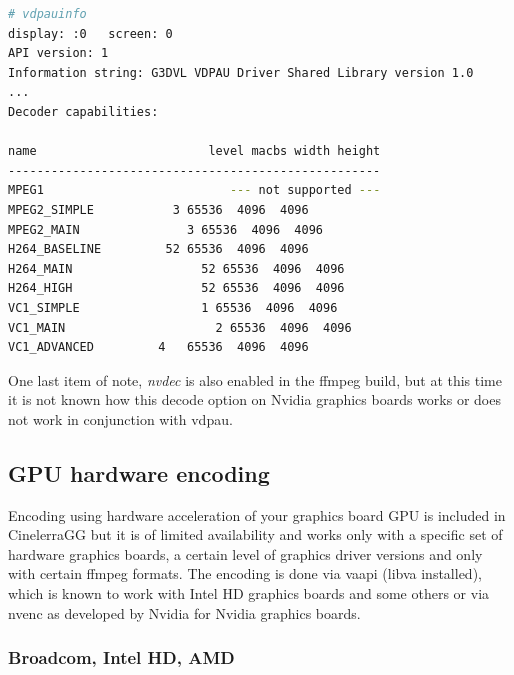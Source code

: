 \begin{lstlisting}[language=bash,numbers=none]
# vdpauinfo
display: :0   screen: 0
API version: 1
Information string: G3DVL VDPAU Driver Shared Library version 1.0
...
Decoder capabilities:

name                        level macbs width height
----------------------------------------------------
MPEG1                          --- not supported ---                                                                      
MPEG2_SIMPLE           3 65536  4096  4096                                                                       
MPEG2_MAIN               3 65536  4096  4096                                                                       
H264_BASELINE         52 65536  4096  4096                                                                       
H264_MAIN                  52 65536  4096  4096                                                                       
H264_HIGH                  52 65536  4096  4096                                                                       
VC1_SIMPLE                 1 65536  4096  4096                                                                       
VC1_MAIN                     2 65536  4096  4096                                                                       
VC1_ADVANCED         4   65536  4096  4096 
\end{lstlisting}

One last item of note, \textit{nvdec} is also enabled in the ffmpeg build, but at this time it is not known how this decode option on Nvidia graphics boards works or does not work in conjunction with vdpau.

\subsection{GPU hardware encoding}%
\label{sub:gpu_hardware_encoding}

Encoding using hardware acceleration of your graphics board GPU is included in CinelerraGG but it is of limited availability and works only with a specific set of hardware graphics boards, a certain level of graphics driver versions and only with certain ffmpeg formats.  The encoding is done via vaapi (libva installed), which is known to work with Intel HD graphics boards and some others or via nvenc as developed by Nvidia for Nvidia graphics boards.

\subsubsection*{Broadcom, Intel HD, AMD}%
\label{ssub:broadcom_intel_amd}


